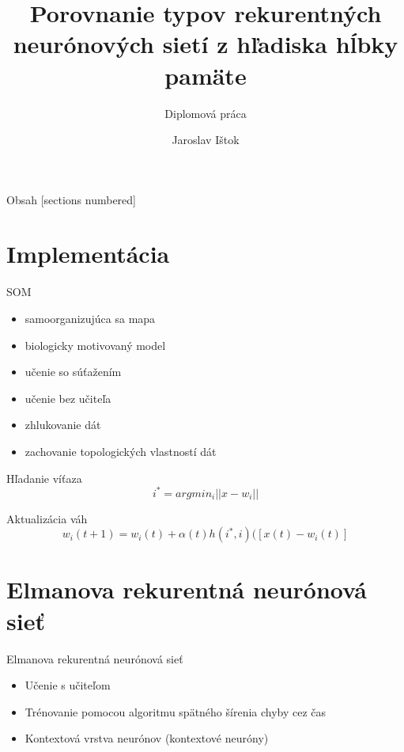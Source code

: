 \documentclass[10pt]{beamer}
\title{Porovnanie typov rekurentných neurónových sietí z hľadiska hĺbky pamäte}
\subtitle{Diplomová práca}
\date{}
\author{Jaroslav Ištok}
\begin{document}
\maketitle

\begin{frame}{Obsah}
  [sections numbered]
  \tableofcontents[hideallsubsections]
\end{frame}

\section{Implementácia}
\begin{frame}[fragile]{SOM}

\begin{itemize}
  \item samoorganizujúca sa mapa
  \item biologicky motivovaný model
  \item učenie so súťažením
  \item učenie bez učiteľa
  \item zhlukovanie dát
  \item zachovanie topologických vlastností dát
\end{itemize}

Hľadanie víťaza
\begin{equation*}
i^* = argmin_i||x-w_i|| 
\end{equation*}

Aktualizácia váh
\begin{equation*}
w_i(t+1) = w_i(t) + \alpha(t)h(i^*, i)([x(t) - w_i(t)]
\end{equation*}

\end{frame}


\section{Elmanova rekurentná neurónová sieť}

\begin{frame}[fragile]{Elmanova rekurentná neurónová sieť}
\begin{itemize}
\item Učenie s učiteľom 
\item Trénovanie pomocou algoritmu spätného šírenia chyby cez čas
\item Kontextová vrstva neurónov (kontextové neuróny)
\end{itemize}
\end{frame}
\end{document}
